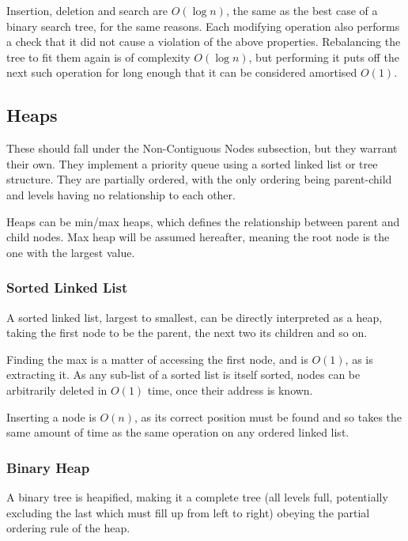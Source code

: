 \documentclass[]{article}
\begin{document}
Insertion, deletion and search are $O(\log{n})$, the same as the best case of a binary search tree, for the same reasons. Each modifying operation also performs a check that it did not cause a violation of the above properties. Rebalancing the tree to fit them again is of complexity $O(\log{n})$, but performing it puts off the next such operation for long enough that it can be considered amortised $O(1)$.

\pagebreak

\subsection{Heaps}

These should fall under the Non-Contiguous Nodes subsection, but they warrant their own. They implement a priority queue using a sorted linked list or tree structure. They are partially ordered, with the only ordering being parent-child and levels having no relationship to each other.

Heaps can be min/max heaps, which defines the relationship between parent and child nodes. Max heap will be assumed hereafter, meaning the root node is the one with the largest value.

\subsubsection{Sorted Linked List}

A sorted linked list, largest to smallest, can be directly interpreted as a heap, taking the first node to be the parent, the next two its children and so on.

Finding the max is a matter of accessing the first node, and is $O(1)$, as is extracting it. As any sub-list of a sorted list is itself sorted, nodes can be arbitrarily deleted in $O(1)$ time, once their address is known.

Inserting a node is $O(n)$, as its correct position must be found and so takes the same amount of time as the same operation on any ordered linked list.

\subsubsection{Binary Heap}

A binary tree is heapified, making it a complete tree (all levels full, potentially excluding the last which must fill up from left to right) obeying the partial ordering rule of the heap.
\end{document}
